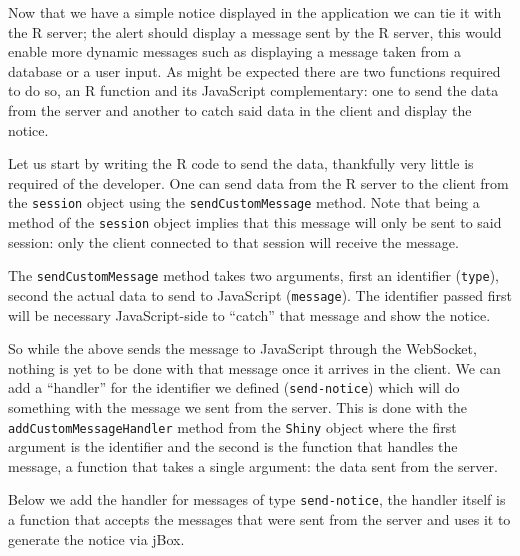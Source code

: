 \documentclass[
  10pt,
]{krantz}
\makeatletter
\newenvironment{Shaded}{\begin{snugshade}}{\end{snugshade}}
\newcommand{\CommentTok}[1]{\textcolor[rgb]{0.37,0.37,0.37}{\textit{#1}}}
\newcommand{\ControlFlowTok}[1]{\textcolor[rgb]{0.27,0.27,0.27}{\textbf{#1}}}
\newcommand{\DataTypeTok}[1]{\textcolor[rgb]{0.27,0.27,0.27}{#1}}
\newcommand{\KeywordTok}[1]{\textcolor[rgb]{0.27,0.27,0.27}{\textbf{#1}}}
\newcommand{\NormalTok}[1]{#1}
\newcommand{\OperatorTok}[1]{\textcolor[rgb]{0.43,0.43,0.43}{\textbf{#1}}}
\newcommand{\StringTok}[1]{\textcolor[rgb]{0.5,0.5,0.5}{#1}}
\newenvironment{kframe}{%
\medskip{}
\setlength{\fboxsep}{.8em}
 \def\at@end@of@kframe{}%
 \ifinner\ifhmode%
  \def\at@end@of@kframe{\end{minipage}}%
  \begin{minipage}{\columnwidth}%
 \fi\fi%
 \def\FrameCommand##1{\hskip\@totalleftmargin \hskip-\fboxsep
 \colorbox{shadecolor}{##1}\hskip-\fboxsep
     \hskip-\linewidth \hskip-\@totalleftmargin \hskip\columnwidth}%
 \MakeFramed {\advance\hsize-\width
   \@totalleftmargin\z@ \linewidth\hsize
   \@setminipage}}%
 {\par\unskip\endMakeFramed%
 \at@end@of@kframe}
\renewenvironment{Shaded}{\begin{kframe}}{\end{kframe}}
\makeatother
\begin{document}
Now that we have a simple notice displayed in the application we can tie it with the R server; the alert should display a message sent by the R server, this would enable more dynamic messages such as displaying a message taken from a database or a user input. As might be expected there are two functions required to do so, an R function and its JavaScript complementary: one to send the data from the server and another to catch said data in the client and display the notice.

Let us start by writing the R code to send the data, thankfully very little is required of the developer. One can send data from the R server to the client from the \texttt{session} object using the \texttt{sendCustomMessage} method. Note that being a method of the \texttt{session} object implies that this message will only be sent to said session: only the client connected to that session will receive the message.

The \texttt{sendCustomMessage} method takes two arguments, first an identifier (\texttt{type}), second the actual data to send to JavaScript (\texttt{message}). The identifier passed first will be necessary JavaScript-side to ``catch'' that message and show the notice.

\begin{Shaded}
\end{Shaded}

So while the above sends the message to JavaScript through the WebSocket, nothing is yet to be done with that message once it arrives in the client. We can add a ``handler'' for the identifier we defined (\texttt{send-notice}) which will do something with the message we sent from the server. This is done with the \texttt{addCustomMessageHandler} method from the \texttt{Shiny} object where the first argument is the identifier and the second is the function that handles the message, a function that takes a single argument: the data sent from the server.

Below we add the handler for messages of type \texttt{send-notice}, the handler itself is a function that accepts the messages that were sent from the server and uses it to generate the notice via jBox.
\end{document}
